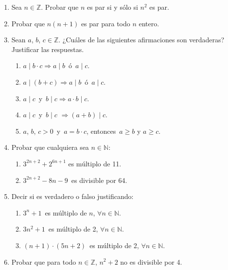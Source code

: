 \documentclass[12pt,spanish,makeidx]{amsbook}
\begin{document}
\begin{enumerate}
\smallskip

\item Sea $n\in \mathbb Z$. Probar que $n$ es par si y s\'olo si $n^2$ es par.

\smallskip

\item Probar que $n(n+1)$ es par para todo $n$ entero.

\smallskip

\item Sean $a$, $b$, $c \in {\mathbb Z}$. ¿Cu\'ales de las siguientes afirmaciones son verdaderas? Justificar las respuestas.
  \begin{enumerate}
  \item $a \mid b\cdot c \Rightarrow a \mid b$\, \'o \,$a \mid c$.
  \item $a \mid (b+c) \Rightarrow a\mid b$\, \'o \,$a \mid c$.
  \item $a \mid c$\, y \,$b \mid c \Rightarrow a\cdot b \mid c$.
  \item $a \mid c$\, y \,$b \mid c$ $\Rightarrow (a +b) \mid c$.
  \item $a$, $b$, $c>0$\, y \,$a=b\cdot c$, entonces\, $a \ge b$ y $a \ge c$.
  \end{enumerate}


\smallskip

\item Probar que cualquiera sea $n \in {\mathbb N}$:
  \begin{enumerate}
  \item $3^{2n+2}+ 2^{6n+1}$ es m\'ultiplo de 11.
  \item $3^{2n+2} - 8n - 9$\, es divisible por 64.
  \end{enumerate}

\smallskip

\item Decir si es verdadero o falso justificando:
  \begin{enumerate}
  \item $3^n+1$\, es m\'ultiplo de $n$, $\forall n \in {\mathbb N}$.
  \item $3n^2+1$\, es m\'ultiplo de 2, $\forall n \in {\mathbb N}$.
  \item $(n+1)\cdot (5n+2)$\, es m\'ultiplo de 2, $\forall n \in {\mathbb N}$.
  \end{enumerate}

\smallskip

\item Probar que para todo $n \in {\mathbb Z}$, $n^2 + 2$ no es divisible por 4.



\end{enumerate}
\end{document}
